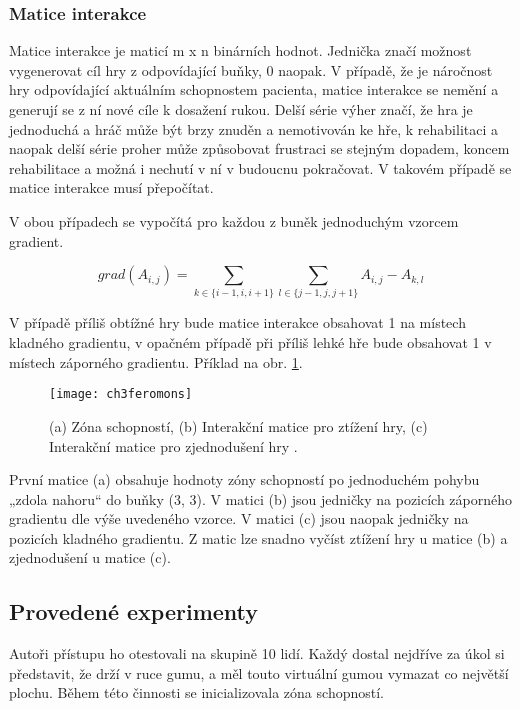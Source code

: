 \subsubsection{Matice interakce}

Matice interakce je maticí m x n binárních hodnot. Jednička značí možnost vygenerovat cíl hry z odpovídající buňky, 0 naopak. V případě, že je náročnost hry odpovídající aktuálním schopnostem pacienta, matice interakce se nemění a generují se z ní nové cíle k dosažení rukou. Delší série výher značí, že hra je jednoduchá a hráč může být brzy znuděn a nemotivován ke hře, k rehabilitaci a naopak delší série proher může způsobovat frustraci se stejným dopadem, koncem rehabilitace a možná i nechutí v ní v budoucnu pokračovat. V takovém případě se matice interakce musí přepočítat.

V obou případech se vypočítá pro každou z buněk jednoduchým vzorcem gradient.

\begin{equation}
	grad(A_{i,j}) = \sum_{k \in \{i-1, i, i+1\}} \sum_{l \in \{j-1, j, j+1\}} A_{i, j} - A_{k, l}
\end{equation}

V případě příliš obtížné hry bude matice interakce obsahovat 1 na místech kladného gradientu, v opačném případě při příliš lehké hře bude obsahovat 1 v místech záporného gradientu. Příklad na obr. \ref{fig-ch3feromons}.

\begin{figure}
  \centering
  \texttt{[image: ch3feromons]}
	\caption{(a) Zóna schopností, (b) Interakční matice pro ztížení hry, (c) Interakční matice pro zjednodušení hry \cite{26poststroke}. }
	\label{fig-ch3feromons}
\end{figure}

První matice (a) obsahuje hodnoty zóny schopností po jednoduchém pohybu „zdola nahoru“ do buňky (3, 3). V matici (b) jsou jedničky na pozicích záporného gradientu dle výše uvedeného vzorce. V matici (c) jsou naopak jedničky na pozicích kladného gradientu. Z matic lze snadno vyčíst ztížení hry u matice (b) a zjednodušení u matice (c).

\subsection{Provedené experimenty}

Autoři přístupu ho otestovali na skupině 10 lidí. Každý dostal nejdříve za úkol si představit, že drží v ruce gumu, a měl touto virtuální gumou vymazat co největší plochu. Během této činnosti se inicializovala zóna schopností.

